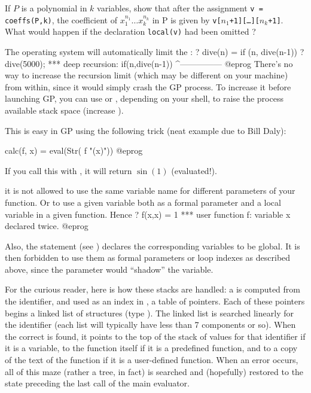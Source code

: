 \noindent If $P$ is a polynomial in $k$ variables, show that after the
assignment {\tt v = coeffs(P,k)}, the coefficient of $x_1^{n_1}\dots
x_k^{n_k}$ in P is given by {\tt v[$n_1$+1][\dots][$n_k$+1]}. What would
happen if the declaration {\tt local(v)} had been omitted ?

The operating system will automatically limit the :
\bprog
? dive(n) = if (n, dive(n-1))
? dive(5000);
  ***   deep recursion: if(n,dive(n-1))
                        ^---------------
@eprog
There's no way to increase the recursion limit (which may be different on
your machine) from within, since it would simply crash the GP process. To
increase it before launching GP, you can use  or ,
depending on your shell, to raise the process available stack space
(increase ).

 This is easy
in GP using the following trick (neat example due to Bill Daly):

\bprog
calc(f, x) = eval(Str( f "(x)"))
@eprog

\noindent If you call this with , it will
return $\sin(1)$ (evaluated!).

 it is not allowed to use the same
variable name for different parameters of your function. Or to use a given
variable both as a formal parameter and a local variable in a given function.
Hence
\bprog
? f(x,x) = 1
  ***   user function f: variable x declared twice.
@eprog

Also, the statement  (see
) declares the corresponding variables to be global. It
is then forbidden to use them as formal parameters or loop indexes as
described above, since the parameter would ``shadow'' the variable.

 For the curious reader, here is how these
stacks are handled: a  is computed from the identifier,
and used as an index in , a table of pointers. Each of
these pointers begins a linked list of structures (type ).
The linked list is searched linearly for the identifier (each list will
typically have less than 7 components or so). When the correct 
is found, it points to the top of the stack of values for that identifier if
it is a variable, to the function itself if it is a predefined function, and
to a copy of the text of the function if it is a user-defined function. When
an error occurs, all of this maze (rather a tree, in fact) is searched and
(hopefully) restored to the state preceding the last call of the main
evaluator.

